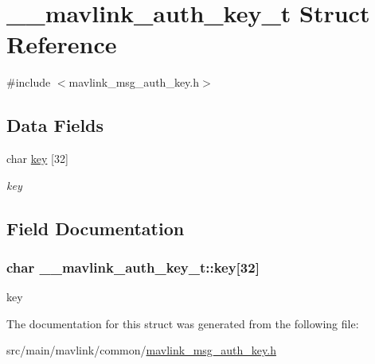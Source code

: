 \hypertarget{struct____mavlink__auth__key__t}{\section{\+\_\+\+\_\+mavlink\+\_\+auth\+\_\+key\+\_\+t Struct Reference}
\label{struct____mavlink__auth__key__t}
}


{\ttfamily \#include $<$mavlink\+\_\+msg\+\_\+auth\+\_\+key.\+h$>$}

\subsection*{Data Fields}
\begin{DoxyCompactItemize}
\item 
char \hyperlink{struct____mavlink__auth__key__t_a3af4c05cfbd8d329c8c3a73e7a726cdc}{key} \mbox{[}32\mbox{]}
\begin{DoxyCompactList}\small\item\em key \end{DoxyCompactList}\end{DoxyCompactItemize}


\subsection{Field Documentation}
\hypertarget{struct____mavlink__auth__key__t_a3af4c05cfbd8d329c8c3a73e7a726cdc}{
\subsubsection[{key}]{\setlength{\rightskip}{0pt plus 5cm}char \+\_\+\+\_\+mavlink\+\_\+auth\+\_\+key\+\_\+t\+::key\mbox{[}32\mbox{]}}}\label{struct____mavlink__auth__key__t_a3af4c05cfbd8d329c8c3a73e7a726cdc}


key 



The documentation for this struct was generated from the following file\+:\begin{DoxyCompactItemize}
\item 
src/main/mavlink/common/\hyperlink{mavlink__msg__auth__key_8h}{mavlink\+\_\+msg\+\_\+auth\+\_\+key.\+h}\end{DoxyCompactItemize}
